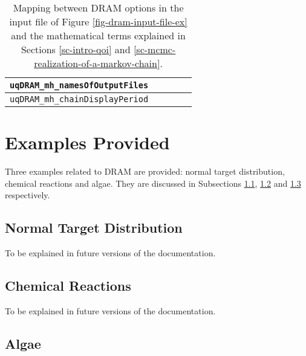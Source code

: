 \begin{sidewaystable}
\begin{tabular}{|l|c|c|c|c|}
\hline
\verb=uqDRAM_mh_namesOfOutputFiles=      &                   &               &             &                   \\
\hline
\verb=uqDRAM_mh_chainDisplayPeriod=      &                   &               &             &                   \\
\hline
\end{tabular}
\caption{Mapping between DRAM options in the input file of Figure \ref{fig-dram-input-file-ex} and the mathematical terms explained in Sections \ref{sc-intro-qoi} and \ref{sc-mcmc-realization-of-a-markov-chain}.
}
\label{tab-dram-map}
\end{sidewaystable}

\section{Examples Provided}\label{sc-mcmc-dram-examples}

Three examples related to DRAM are provided: normal target distribution, chemical reactions and algae.
They are discussed in Subsections \ref{subsc-mcmc-dram-normal-ex}, \ref{subsc-mcmc-dram-himmel-ex} and \ref{subsc-mcmc-dram-algae-ex} respectively.

\subsection{Normal Target Distribution}\label{subsc-mcmc-dram-normal-ex}

To be explained in future versions of the documentation.

\subsection{Chemical Reactions}\label{subsc-mcmc-dram-himmel-ex}

To be explained in future versions of the documentation.

\subsection{Algae}\label{subsc-mcmc-dram-algae-ex}

